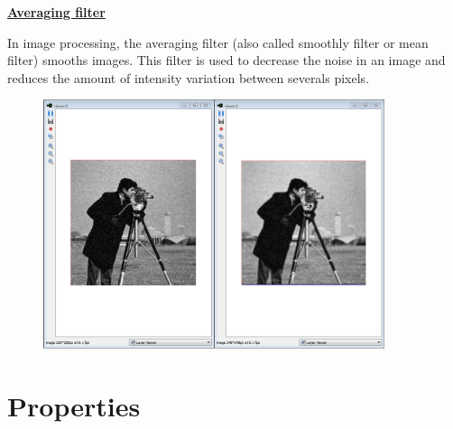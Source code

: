 \documentclass[12pt,a4paper]{article}
\begin{document}
\begin{center}
\textbf{\huge  \underline{Averaging filter}}
\end{center}
\vspace{0.5cm}


In image processing, the averaging filter (also called smoothly filter or mean filter) smooths images. This filter is used to decrease the noise in an image and reduces the amount of intensity variation between severals pixels. \\

\vspace{0.5cm}

\begin{figure}[h!]
\centering
{}
\end{figure}

\vspace{1.5cm}

\begin{figure}[!h]
\centering
\includegraphics[width=10cm]{averagingfilter.png}
\end{figure}

\section*{Properties}
\end{document}

